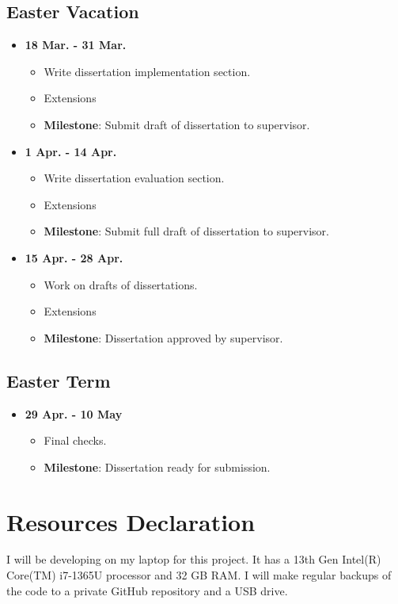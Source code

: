 \documentclass[a4paper, 12pt]{article}
\begin{document}
\subsection{Easter Vacation}
\begin{itemize}
  \item \textbf{18 Mar. - 31 Mar.}
    \begin{itemize}
      \item Write dissertation implementation section.
      \item Extensions
      \item \textbf{Milestone}: Submit draft of dissertation to supervisor.
    \end{itemize}
  \item \textbf{1 Apr. - 14 Apr.}
    \begin{itemize}
      \item Write dissertation evaluation section.
      \item Extensions
      \item \textbf{Milestone}: Submit full draft of dissertation to supervisor.
    \end{itemize}
  \item \textbf{15 Apr. - 28 Apr.}
    \begin{itemize}
      \item Work on drafts of dissertations.
      \item Extensions
      \item \textbf{Milestone}: Dissertation approved by supervisor.
    \end{itemize}
\end{itemize}

\subsection{Easter Term}
\begin{itemize}
  \item \textbf{29 Apr. - 10 May}
    \begin{itemize}
      \item Final checks.
      \item \textbf{Milestone}: Dissertation ready for submission.
    \end{itemize}
\end{itemize}

\section{Resources Declaration}

I will be developing on my laptop for this project. It has a 13th Gen Intel(R) Core(TM) i7-1365U processor and 32 GB RAM. I will make regular backups of the code to a private GitHub repository and a USB drive.

\ifdefined\maindoc
\else


\fi
\end{document}
